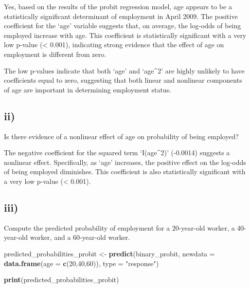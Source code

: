 \documentclass[
]{article}
\newenvironment{Shaded}{\begin{snugshade}}{\end{snugshade}}
\newcommand{\AttributeTok}[1]{\textcolor[rgb]{0.13,0.29,0.53}{#1}}
\newcommand{\DecValTok}[1]{\textcolor[rgb]{0.00,0.00,0.81}{#1}}
\newcommand{\FunctionTok}[1]{\textcolor[rgb]{0.13,0.29,0.53}{\textbf{#1}}}
\newcommand{\NormalTok}[1]{#1}
\newcommand{\OtherTok}[1]{\textcolor[rgb]{0.56,0.35,0.01}{#1}}
\newcommand{\StringTok}[1]{\textcolor[rgb]{0.31,0.60,0.02}{#1}}
\begin{document}
Yes, based on the results of the probit regression model, age appears to
be a statistically significant determinant of employment in April 2009.
The positive coefficient for the `age' variable suggests that, on
average, the log-odds of being employed increase with age. This
coefficient is statistically significant with a very low p-value
(\textless{} 0.001), indicating strong evidence that the effect of age
on employment is different from zero.

The low p-values indicate that both `age' and `age\^{}2' are highly
unlikely to have coefficients equal to zero, suggesting that both linear
and nonlinear components of age are important in determining employment
status.

\hypertarget{ii-1}{%
\subsection{ii)}\label{ii-1}}

Is there evidence of a nonlinear effect of age on probability of being
employed? \vspace{1em}

The negative coefficient for the squared term `I(age\^{}2)' (-0.0014)
suggests a nonlinear effect. Specifically, as `age' increases, the
positive effect on the log-odds of being employed diminishes. This
coefficient is also statistically significant with a very low p-value
(\textless{} 0.001).

\hypertarget{iii-1}{%
\subsection{iii)}\label{iii-1}}

Compute the predicted probability of employment for a 20-year-old
worker, a 40-year-old worker, and a 60-year-old worker.

\begin{Shaded}
\begin{Highlighting}[]
\NormalTok{predicted\_probabilities\_probit }\OtherTok{\textless{}{-}} \FunctionTok{predict}\NormalTok{(binary\_probit,}
                                          \AttributeTok{newdata =} \FunctionTok{data.frame}\NormalTok{(}\AttributeTok{age =} \FunctionTok{c}\NormalTok{(}\DecValTok{20}\NormalTok{,}\DecValTok{40}\NormalTok{,}\DecValTok{60}\NormalTok{)),}
                                          \AttributeTok{type =} \StringTok{"response"}\NormalTok{)}

\FunctionTok{print}\NormalTok{(predicted\_probabilities\_probit)}
\end{Highlighting}
\end{Shaded}
\end{document}
